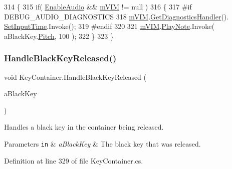 \begin{DoxyCode}
314     \{
315         \textcolor{keywordflow}{if}( \hyperlink{group___key_contain_pub_var_ga5dc9b1349f8fafc894c7f739f6780a8c}{EnableAudio} && \hyperlink{group___key_contain_priv_var_ga57ee3824e2f284403bb70ad9c4dfd307}{mVIM} != null )
316         \{
317 \textcolor{preprocessor}{            #if DEBUG\_AUDIO\_DIAGNOSTICS}
318                 \hyperlink{group___key_contain_priv_var_ga57ee3824e2f284403bb70ad9c4dfd307}{mVIM}.\hyperlink{group___v_i_m_pub_func_ga7e60bc3c5464d8f34f0d56def675bcc6}{GetDiagnosticsHandler}().
      \hyperlink{group___audio_testing_a133561901c2aef535b2f3c098e55b959}{SetInputTime}.Invoke();
319 \textcolor{preprocessor}{            #endif}
320 
321             \hyperlink{group___key_contain_priv_var_ga57ee3824e2f284403bb70ad9c4dfd307}{mVIM}.\hyperlink{group___v_i_m_events_gaa21021c13a8c9d13cbf374d5bf9d68fa}{PlayNote}.Invoke( aBlackKey.\hyperlink{group___black_key_pub_var_gad233c456182c9cef7c01486484940439}{Pitch}, 100 );
322         \}
323     \}
\end{DoxyCode}
\mbox{\label{group___key_contain_event_handlers_ga5a0c5565c5ebc6026b3122f487e51704}} 
\subsubsection{\texorpdfstring{Handle\+Black\+Key\+Released()}{HandleBlackKeyReleased()}}
{\footnotesize\ttfamily void Key\+Container.\+Handle\+Black\+Key\+Released (\begin{DoxyParamCaption}\item[{\hyperlink{class_black_key}{Black\+Key}}]{a\+Black\+Key }\end{DoxyParamCaption})\hspace{0.3cm}{\ttfamily [private]}}



Handles a black key in the container being released. 


\begin{DoxyParams}[1]{Parameters}
\mbox{\tt in}  & {\em a\+Black\+Key} & The black key that was released. \\
\hline
\end{DoxyParams}


Definition at line 329 of file Key\+Container.\+cs.



